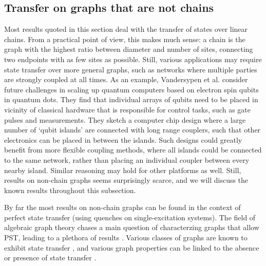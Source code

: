 \subsection{Transfer on graphs that are not chains}
\label{sec:transfergeneralgraphs}
Most results quoted in this section deal with the transfer of states over linear chains. From a practical point of view, this makes much sense: a chain is the graph with the highest ratio between diameter and number of sites, connecting two endpoints with as few sites as possible. Still, various applications may require state transfer over more general graphs, such as networks where multiple parties are strongly coupled at all times. As an example, Vandersypen et al. \cite{Vandersypen2017} consider future challenges in scaling up quantum computers based on electron spin qubits in quantum dots. They find that individual arrays of qubits need to be placed in vicinity of classical hardware that is responsible for control tasks, such as gate pulses and measurements. They sketch a computer chip design where a large number of `qubit islands' are connected with long range couplers, such that other electronics can be placed in between the islands. Such designs could greatly benefit from more flexible coupling methods, where all islands could be connected to the same network, rather than placing an individual coupler between every nearby island. Similar reasoning may hold for other platforms as well. Still, results on non-chain graphs seems surprisingly scarce, and we will discuss the known results throughout this subsection. 

By far the most results on non-chain graphs can be found in the context of perfect state transfer (using quenches on single-excitation systems). The field of algebraic graph theory chases a main question of characterzing graphs that allow PST, leading to a plethora of results \cite{Bachman2011}. Various classes of graphs are known to exhibit state transfer \cite{Bernasconi2008,Basic2009,Cheung2011}, and various graph properties can be linked to the absence or presence of state transfer \cite{Godsil2012,Bachman2011}. 


